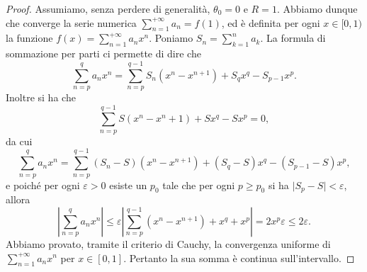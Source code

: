 \documentclass[Completo.tex]{subfiles}
\begin{document}
\begin{proof}
	Assumiamo, senza perdere di generalità, $\theta_0 = 0$ e $R = 1$. Abbiamo dunque che converge la serie numerica $\sum_{n=1}^{+\infty} a_n = f(1)$, ed è definita per ogni $x \in [0,1)$ la funzione $f(x) = \sum_{n=1}^{+\infty} a_n x^n$. Poniamo $S_n = \sum_{k=1}^{n} a_k$. La formula di sommazione per parti ci permette di dire che
	\begin{equation*}
	\sum_{n=p}^{q} a_n x^n = \sum_{n=p}^{q-1}S_n (x^n - x^{n+1}) + S_q x^q - S_{p-1}x^p. 
	\end{equation*} 
	Inoltre si ha che
	\begin{equation*}
	\sum_{n=p}^{q-1} S(x^n-x^n+1) + Sx^q - Sx^p = 0,
	\end{equation*}
	da cui
	\begin{equation*}
	\sum_{n=p}^{q} a_n x^n = \sum_{n=p}^{q-1}(S_n - S)(x^n - x^{n+1}) + (S_q - S)x^q - (S_{p-1} - S)x^p,
	\end{equation*}
	e poiché per ogni $\varepsilon > 0$ esiste un $p_0$ tale che per ogni $p \geq p_0$ si ha $\vert S_p - S \vert < \varepsilon$, allora
	\begin{equation*}
	\left\vert \sum_{n=p}^{q} a_n x^n \right\vert \leq \varepsilon\left\vert \sum_{n=p}^{q-1} (x^n - x^{n+1}) + x^q + x^p \right\vert = 2x^p \varepsilon \leq 2 \varepsilon.
	\end{equation*}
	Abbiamo provato, tramite il criterio di Cauchy, la convergenza uniforme di $\sum_{n=1}^{+\infty} a_n x^n$ per $x \in [0,1]$. Pertanto la sua somma è continua sull'intervallo.
\end{proof}
\end{document}
